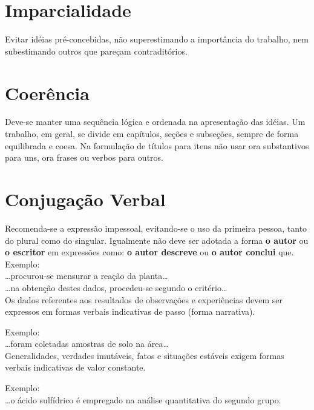 \documentclass[repeatfields,xlists,xpacks,oneside]{ufrgscca}
\begin{document}
\begin{annex}
\section{Imparcialidade}

Evitar idéias pré-concebidas, não superestimando a importância do trabalho,
nem subestimando outros que pareçam contraditórios.

\section{Coerência}

Deve-se manter uma sequência lógica e ordenada na apresentação das idéias.
Um trabalho, em geral, se divide em capítulos, seções e subseções, sempre de
forma equilibrada e coesa. Na formulação de títulos para itens não usar ora
substantivos para uns, ora frases ou verbos para outros.

\section{Conjugação Verbal}

Recomenda-se a expressão impessoal, evitando-se o uso da primeira pessoa,
tanto do plural como do singular. Igualmente não deve ser adotada a forma
{\bf o autor} ou {\bf o escritor} em expressões como: {\bf o autor descreve}
ou {\bf o autor conclui} que.\\

Exemplo:\\

		\ldots procurou-se mensurar a reação da planta\ldots\\

		\ldots na obtenção destes dados, procedeu-se segundo o critério\ldots\\

Os dados  referentes aos resultados de observações e experiências devem ser
expressos em formas verbais indicativas de passo (forma narrativa).

Exemplo:\\

		\ldots foram coletadas amostras de solo na área\ldots\\

Generalidades, verdades imutáveis, fatos e situações estáveis exigem formas
verbais indicativas de valor constante.

Exemplo:\\

		\ldots o ácido sulfídrico é empregado na análise quantitativa do segundo grupo.\\


\end{annex}
\end{document}
